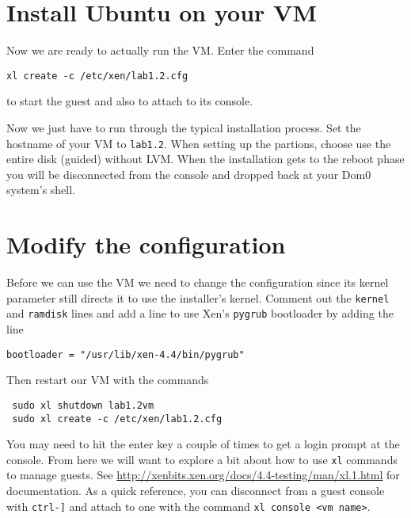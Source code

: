\documentclass{article}
\begin{document}
 \section{Install Ubuntu on your VM}
 Now we are ready to actually run the VM. Enter the command
 
 \texttt{xl create -c /etc/xen/lab1.2.cfg}
 
 to start the guest and also to attach to its console.
 
 Now we just have to run through the typical installation process. Set the hostname of your VM to \texttt{lab1.2}. When setting up the partions,
 choose use the entire disk (guided) without LVM. When the installation gets to the reboot phase you will be disconnected from the console and dropped back at your 
 Dom0 system's shell.
 
 \section{Modify the configuration}
 Before we can use the VM we need to change the configuration since its kernel parameter still directs it to use the installer's kernel. Comment out the \texttt{kernel} and \texttt{ramdisk} lines and add a line to use Xen's \texttt{pygrub} bootloader by adding the line
 
 \texttt{bootloader = "/usr/lib/xen-4.4/bin/pygrub"}
 
 Then restart our VM with the commands
 
 \begin{verbatim}
 sudo xl shutdown lab1.2vm
 sudo xl create -c /etc/xen/lab1.2.cfg
 \end{verbatim}
 
 You may need to hit the enter key a couple of times to get a login prompt at the console. From here we will want to explore a bit about how to use \texttt{xl} commands to manage guests. See \url{http://xenbits.xen.org/docs/4.4-testing/man/xl.1.html} for documentation. As a quick reference, you can disconnect from a guest console with \texttt{ctrl-]} and attach to one with the command \texttt{xl console <vm name>}.
 
 
 
\end{document}

